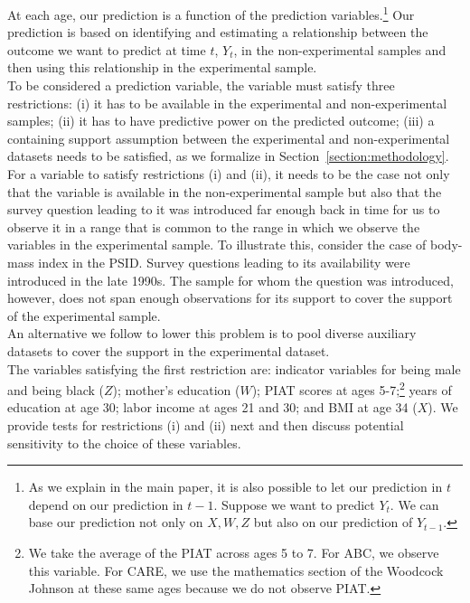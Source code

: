 \noindent At each age, our prediction is a function of the prediction variables.\footnote{As we explain in the main paper, it is also possible to let our prediction in $t$ depend on our prediction in $t-1$. Suppose we want to predict $Y_{t}$. We can base our prediction not only on $X,W,Z$ but also on our prediction of $Y_{t-1}$.} Our prediction is based on identifying and estimating a relationship between the outcome we want to predict at time $t$, $Y_{t}$, in the non-experimental samples and then using this relationship in the experimental sample.\\

\noindent To be considered a prediction variable, the variable must satisfy three restrictions: (i) it has to be available in the experimental and non-experimental samples; (ii) it has to have predictive power on the predicted outcome; (iii) a containing support assumption between the experimental and non-experimental datasets needs to be satisfied, as we formalize in Section~\ref{section:methodology}.\\

\noindent For a variable to satisfy restrictions (i) and (ii), it needs to be the case not only that the variable is available in the non-experimental sample but also that the survey question leading to it was introduced far enough back in time for us to observe it in a range that is common to the range in which we observe the variables in the experimental sample. To illustrate this, consider the case of body-mass index in the PSID. Survey questions leading to its availability were introduced in the late 1990s. The sample for whom the question was introduced, however, does not span enough observations for its support to cover the support of the experimental sample.\\

\noindent An alternative we follow to lower this problem is to pool diverse auxiliary datasets to cover the support in the experimental dataset.\\

\noindent The variables satisfying the first restriction are: indicator variables for being male and being black ($Z$); mother's education ($W$); PIAT scores at ages 5-7;\footnote{We take the average of the PIAT across ages 5 to 7. For ABC, we observe this variable. For CARE, we use the mathematics section of the Woodcock Johnson at these same ages because we do not observe PIAT.} years of education at age 30; labor income at ages 21 and 30; and BMI at age 34 ($X$). We provide tests for restrictions (i) and (ii) next and then discuss potential sensitivity to the choice of these variables.

